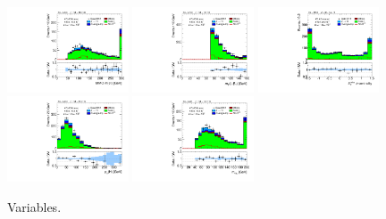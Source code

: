 \begin{figure}[tp]
  \includegraphics[width=0.32\textwidth]{figures/analysis/vbf-WlvCR/mMMC}
  \includegraphics[width=0.32\textwidth]{figures/analysis/vbf-WlvCR/mT-hi}
  \includegraphics[width=0.32\textwidth]{figures/analysis/vbf-WlvCR/met-phi-centrality}
  \includegraphics[width=0.32\textwidth]{figures/analysis/vbf-WlvCR/H-pt-hi}
  \includegraphics[width=0.32\textwidth]{figures/analysis/vbf-WlvCR/mvis}
  \caption{Variables.}
  \label{fig:backgrounds-WlvCR-taus}
\end{figure}


